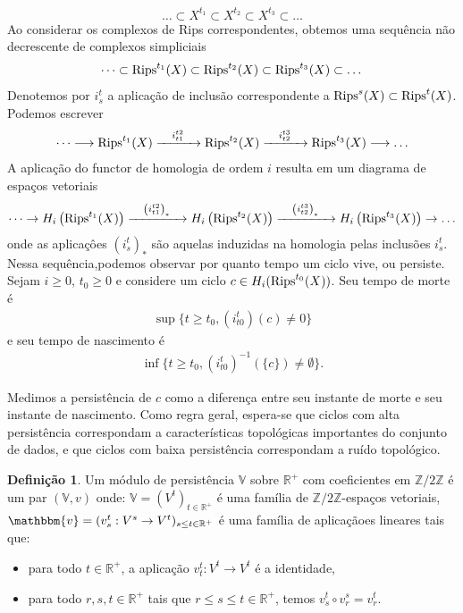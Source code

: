 \documentclass[12pt, a4paper]{article}
\theoremstyle{plain}
\theoremstyle{definition}
\newtheorem{definition}{Definição}[section]
\theoremstyle{remark}
\begin{document}
\[
    \dots \subset X^{t_1} \subset X^{t_2} \subset X^{t_3} \subset \dots
\]
Ao considerar os complexos de Rips correspondentes, obtemos uma sequência não decrescente de complexos simpliciais
\[
    \dots \subset \textnormal{Rips}^{t_1}(X) \subset \textnormal{Rips}^{t_2}(X) \subset \textnormal{Rips}^{t_3}(X) \subset \dots
\]
Denotemos por $i_s^t$ a aplicação de inclusão correspondente a $\textnormal{Rips}^s(X) \subset \textnormal{Rips}^t(X)$. Podemos escrever
\begin{align*}
    \dots \longrightarrow \textnormal{Rips}^{t_1}(X) \xrightarrow{\quad i_{t1}^{t2} \quad} \textnormal{Rips}^{t_2}(X) \xrightarrow{\quad i_{t2}^{t3} \quad} \textnormal{Rips}^{t_3}(X) \longrightarrow \dots
\end{align*}
A aplicação do functor de homologia de ordem $i$ resulta em um diagrama de espaços vetoriais
\begin{align*}
    \dots \rightarrow H_i\left(\textnormal{Rips}^{t_1}(X)\right) \xrightarrow{\quad \left(i_{t1}^{t2}\right)_* \quad} H_i\left(\textnormal{Rips}^{t_2}(X)\right) \xrightarrow{\quad \left(i_{t2}^{t3}\right)_* \quad} H_i\left(\textnormal{Rips}^{t_3}(X)\right) \rightarrow \dots
\end{align*}
onde as aplicaçôes $(i_s^t)_*$ são aquelas induzidas na homologia pelas inclusões $i_s^t$. Nessa sequência,podemos observar por quanto tempo um ciclo vive, ou persiste. Sejam $i \geq 0$, $t_0 \geq 0$ e considere um
ciclo $c \in H_i(\textnormal{Rips}^{t_0}(X))$. Seu tempo de morte é
\begin{align*}
    \sup \{t \geq t_0, \left(i^t_{t0}\right)(c)\neq 0\}
\end{align*}
e seu tempo de nascimento é
\begin{align*}
    \inf \{t \geq t_0, \left(i^t_{t0}\right)^{-1}(\{c\})\neq \emptyset\}.
\end{align*}

Medimos a persistência de $c$ como a diferença entre seu instante de morte e seu instante de nascimento. Como regra geral, espera-se que ciclos com alta persistência correspondam a características topológicas importantes do conjunto de dados, e que ciclos com baixa persistência
correspondam a ruído topológico.

\begin{definition}
    Um módulo de persistência $\mathbb{V}$ sobre $\mathbb{R}^+$ com coeficientes em $\mathbb{Z}/2\mathbb{Z}$ é um par $(\mathbb{V}, v)$ onde: $\mathbb{V} = (V^t)_{t \in \mathbb{R}^+}$ é uma família de $\mathbb{Z}/2\mathbb{Z}$-espaços vetoriais, $\mathbbm{v} = (v_s^t: V^s \to V^t)_{s \leq t \in \mathbb{R}^+}$ é uma família de aplicaçãoes lineares tais que:
    \begin{itemize}
        \item para todo $t \in \mathbb{R}^+$, a aplicação $v_t^t: V^t \to V^t$ é a identidade,
        \item para todo $r,s,t \in \mathbb{R}^+$ tais que $r \leq s \leq t \in \mathbb{R}^+$, temos $v_s^t \circ v_r^s = v_r^t$.
    \end{itemize}
\end{definition}
\end{document}
